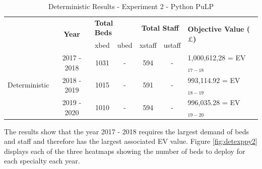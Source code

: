 \documentclass[../thesis.tex]{subfiles}
\begin{document}
\begin{table}[h!]
    \centering
    \begin{tabular}{ccccccl}\toprule
 & \multirow{2}{*}{\textbf{Year}}& \multicolumn{2}{l}{\textbf{Total Beds}} & \multicolumn{2}{c}{\textbf{Total Staff}} & \multirow{2}{*}{\textbf{Objective Value ($\pounds$)}}\\ \cmidrule(lr){3-4} \cmidrule(lr){5-6}
&& xbed           & ubed          & xstaff         & ustaff         \\ \midrule
     \multirow{3}{*}{Deterministic} & 2017 - 2018 & 1031 & - &  594 & - & 1,000,612,28 =  EV$_{17-18}$ \\ 
      & 2018 - 2019 & 1015 & - & 591 & - & 993,114.92 =  EV$_{18-19}$ \\
      & 2019 - 2020 & 1010 & - & 594 & - & 996,035.28 =  EV$_{19-20}$\\ \bottomrule
    \end{tabular}
    \caption{Deterministic Results - Experiment 2 - Python PuLP}
    \label{tab:detresultspy2}
\end{table}

The results show that the year 2017 - 2018 requires the largest demand of beds and staff and therefore has the largest associated EV value. Figure \ref{fig:detexppy2} displays each of the three heatmaps showing the number of beds to deploy for each specialty each year. 
\end{document}
